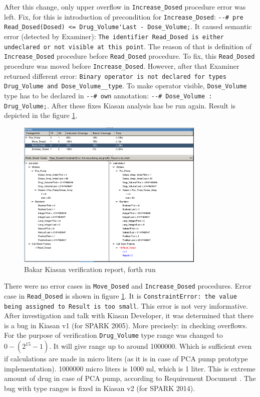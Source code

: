 After this change, only upper overflow in \lstinline{Increase_Dosed} procedure error was left. Fix, for this is introduction of precondition for \lstinline{Increase_Dosed}: \lstinline{--# pre Read_Dosed(Dosed) <= Drug_Volume'Last - Dose_Volume;}. It caused semantic error (detected by Examiner): \lstinline{The identifier Read_Dosed is either undeclared or not visible at this point}. The reason of that is definition of \lstinline{Increase_Dosed} procedure before \lstinline{Read_Dosed} procedure. To fix, this \lstinline{Read_Dosed} procedure was moved before \lstinline{Increase_Dosed}. However, after that Examiner returned different error: \lstinline{Binary operator is not declared for types Drug_Volume and Dose_Volume__type}. To make operator visible, \lstinline{Dose_Volume} type has to be declared in \lstinline{--# own} annotation: \lstinline{--# Dose_Volume : Drug_Volume;}. After these fixes Kiasan analysis has be run again. Result is depicted in the figure \ref{figure:sparkverification:kiasanreport4}.

\begin{figure}[ht]%
    \begin{center}
        \includegraphics[width=0.8\textwidth]{figures/pca-pump-verification-step4.png}
    \end{center}
    \caption{Bakar Kiasan verification report, forth run}
    \label{figure:sparkverification:kiasanreport4}
\end{figure}

There were no error cases in \lstinline{Move_Dosed} and \lstinline{Increase_Dosed} procedures. Error case in \lstinline{Read_Dosed} is shown in figure \ref{figure:sparkverification:kiasanreport4}. It is \lstinline{ConstraintError: the value being assigned to Result is too small}. This error is not very imformative. After investigation and talk with Kiasan Developer, it was determined that there is a bug in Kiasan v1 (for SPARK 2005). More precisely: in checking overflows. For the purpose of verification \lstinline{Drug_Volume} type range was changed to $0 - (2^{15} - 1)$. It will give range up to around 1000000. Which is sufficient even if calculations are made in micro liters (as it is in case of PCA pump prototype implementation). 1000000 micro liters is 1000 ml, which is 1 liter. This is extreme amount of drug in case of PCA pump, according to Requirement Document \cite{OpenSourcePCAPump:Paper}. The bug with type ranges is fixed in Kiasan v2 (for SPARK 2014).

